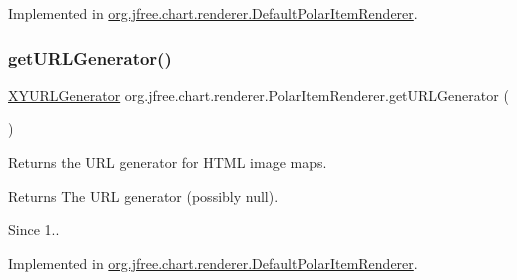 Implemented in \mbox{\hyperlink{classorg_1_1jfree_1_1chart_1_1renderer_1_1_default_polar_item_renderer_a8cb1713bde0d1ef338294ee530885743}{org.\+jfree.\+chart.\+renderer.\+Default\+Polar\+Item\+Renderer}}.

\mbox{\label{interfaceorg_1_1jfree_1_1chart_1_1renderer_1_1_polar_item_renderer_afe0889dc56f6a7a66f5c743b51548ff5}} 
\subsubsection{\texorpdfstring{get\+U\+R\+L\+Generator()}{getURLGenerator()}}
{\footnotesize\ttfamily \mbox{\hyperlink{interfaceorg_1_1jfree_1_1chart_1_1urls_1_1_x_y_u_r_l_generator}{X\+Y\+U\+R\+L\+Generator}} org.\+jfree.\+chart.\+renderer.\+Polar\+Item\+Renderer.\+get\+U\+R\+L\+Generator (\begin{DoxyParamCaption}{ }\end{DoxyParamCaption})}

Returns the U\+RL generator for H\+T\+ML image maps.

\begin{DoxyReturn}{Returns}
The U\+RL generator (possibly null).
\end{DoxyReturn}
\begin{DoxySince}{Since}
1.. 
\end{DoxySince}


Implemented in \mbox{\hyperlink{classorg_1_1jfree_1_1chart_1_1renderer_1_1_default_polar_item_renderer_a4bb8861bfb9aec6a0e62a26e285f09fe}{org.\+jfree.\+chart.\+renderer.\+Default\+Polar\+Item\+Renderer}}.

\mbox{\label{interfaceorg_1_1jfree_1_1chart_1_1renderer_1_1_polar_item_renderer_a643f02dd9cbde3f33cac94589245fdc4}} 
